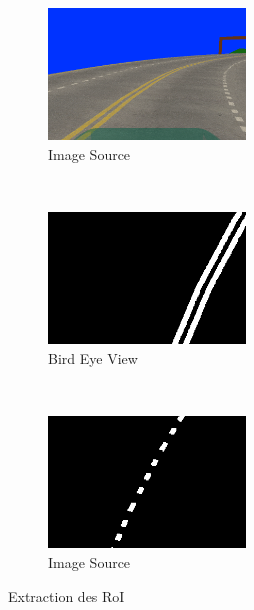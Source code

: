 \documentclass[12pt, openany]{report}
\begin{document}
\begin{figure}[H]
     \centering
     \begin{subfigure}[b]{0.45\textwidth}
         \centering
         \includegraphics[width=\textwidth, height = 3.5cm]{5.png}
         \caption{Image Source}
     \end{subfigure}
     \\
     \begin{subfigure}[b]{0.45\textwidth}
         \centering
         \includegraphics[width=\textwidth, height = 3.5cm]{roiL.png}
         \caption{Bird Eye View}
     \end{subfigure}
     ~
     \begin{subfigure}[b]{0.45\textwidth}
         \centering
         \includegraphics[width=\textwidth, height = 3.5cm]{roiR.png}
         \caption{Image Source}
     \end{subfigure}
    \caption{Extraction des RoI}
    \label{fig:roi} 
\end{figure}
\end{document}
